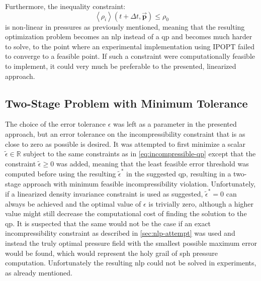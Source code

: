 \documentclass[conference]{IEEEtran}
\newcommand\vek[1]{\vec{\bm{#1}}}
\newcommand\abr[1]{\left\langle#1\right\rangle}
\begin{document}
Furthermore, the inequality constraint:
\begin{equation}
  \abr{\rho_i}(t+\Delta t, \vek{p}) \leq \rho_0
\end{equation}
is non-linear in pressures as previously mentioned, meaning that the resulting optimization problem becomes an \ac{nlp} instead of a \ac{qp} and becomes much harder to solve, to the point where an experimental implementation using IPOPT \cite{ipopt} failed to converge to a feasible point. If such a constraint were computationally feasible to implement, it could very much be preferable to the presented, linearized approach.

\subsection{Two-Stage Problem with Minimum Tolerance}
The choice of the error tolerance $\epsilon$ was left as a parameter in the presented approach, but an error tolerance on the incompressibility constraint that is as close to zero as possible is desired. It was attempted to first minimize a scalar $\tilde{\epsilon} \in\mathds{R}$ subject to the same constraints as in \autoref{eq:incompressible-qp} except that the constraint $\tilde{\epsilon} \geq 0$ was added, meaning that the least feasible error threshold was computed before using the resulting $\tilde{\epsilon}^*$ in the suggested \ac{qp}, resulting in a two-stage approach with minimum feasible incompressibility violation. Unfortunately, if a linearized density invariance constraint is used as suggested, $\tilde{\epsilon}^*=0$ can always be achieved and the optimal value of $\epsilon$ is trivially zero, although a higher value might still decrease the computational cost of finding the solution to the \ac{qp}. It is suspected that the same would not be the case if an exact incompressibility constraint as described in \autoref{sec:nlp-attempt} was used and instead the truly optimal pressure field with the smallest possible maximum error would be found, which would represent the holy grail of \ac{sph} pressure computation. Unfortunately the resulting \ac{nlp} could not be solved in experiments, as already mentioned.
\end{document}
